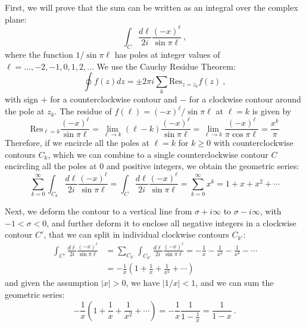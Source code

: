 \begin{enumerate}
\begin{solution}
              First, we will prove that the sum can be written as an integral over the complex plane:
              \begin{equation}
                  \int_C\frac{d\ell}{2i}\frac{(-x)^\ell}{\sin\pi\ell} \ ,
              \end{equation}
              where the function $1/\sin\pi\ell$ has poles at integer values of $\ell=\ldots, -2,-1,0,1,2,\ldots$
              We use the Cauchy Residue Theorem:
              \begin{equation}
                  \oint f(z) dz = \pm 2\pi i \sum_{k}\textrm{Res}_{z=z_k}f(z) \ ,
              \end{equation}
              with sign $+$ for a counterclockwise contour and $-$ for a clockwise contour around the pole at $z_k$.
              The residue of $f(\ell)=(-x)^\ell/\sin\pi\ell$ at $\ell=k$ is given by
              \begin{equation}
                  \textrm{Res}_{\ell=k}\frac{(-x)^\ell}{\sin\pi\ell}=\lim_{\ell\to k}(\ell-k)\frac{(-x)^\ell}{\sin\pi\ell}=\lim_{\ell\to k}\frac{(-x)^\ell}{\pi\cos\pi\ell}=\frac{x^k}{\pi}
              \end{equation}
              Therefore, if we encircle all the poles at $\ell=k$ for $k\geq 0$ with counterclockwise contours $C_k$, which we can combine to a single counterclockwise contour $C$ encircling all the poles at $0$ and positive integers, we obtain the geometric series:
              \begin{equation}
                  \sum_{k=0}^\infty\int_{C_k}\frac{d\ell}{2i}\frac{(-x)^\ell}{\sin\pi\ell}=\int_C\frac{d\ell}{2i}\frac{(-x)^\ell}{\sin\pi\ell}=\sum_{k=0}^\infty x^k=1+x+x^2+\cdots
              \end{equation}

              Next, we deform the contour to a vertical line from $\sigma+i\infty$ to $\sigma-i\infty$, with $-1<\sigma<0$, and further deform it to enclose all negative integers in a clockwise contour $C'$, that we can split in individual clockwise contours $C_{k'}$:
              \begin{align}
                  \int_{C'}\frac{d\ell}{2i}\frac{(-x)^\ell}{\sin\pi\ell} & =\sum_{C_{k'}}\int_{C_{k'}}\frac{d\ell}{2i}\frac{(-x)^\ell}{\sin\pi\ell}=-\frac{1}{x}-\frac{1}{x^2}-\frac{1}{x^3}-\cdots \\
                                                                         & =-\frac{1}{x}\left(1+\frac{1}{x}+\frac{1}{x^2}+\cdots\right)    \nonumber
              \end{align}
              and given the assumption $|x|>0$, we have $|1/x|<1$, and we can sum the geometric series:
              \begin{equation}
                  -\frac{1}{x}\left(1+\frac{1}{x}+\frac{1}{x^2}+\cdots\right)    = -\frac{1}{x}\frac{1}{1-\frac{1}{x}}=\frac{1}{1-x} \ .
              \end{equation}
          \end{solution}


\end{enumerate}
